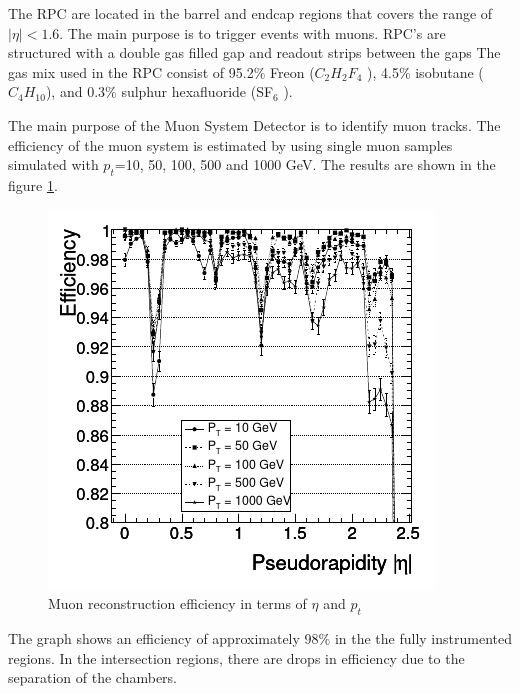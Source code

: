 The RPC are located in the barrel and endcap regions that covers the range of $|\eta|<1.6$. The main purpose is to trigger events with muons. 
RPC's are structured with a double gas filled gap and readout strips between the gaps
 The gas mix used in the RPC consist of 95.2$\%$ Freon
($C_2 H_2 F_4$ ), 4.5$\%$ isobutane ($C_4 H_{10}$), and 0.3$\%$ sulphur hexafluoride (SF$_6$ )\cite{cms7}.



The main purpose of the Muon System Detector is to identify muon tracks. 
The efficiency of the muon system is estimated by using single muon samples simulated with $p_t$=10, 50, 100, 500 and 1000 GeV. The results are shown in the figure \ref{mu-efi}.
\begin{figure}
	\centering
	\includegraphics[width=0.6\linewidth]{Chapter2/mu-efi}
	\caption[Muon reconstruction efficiency in terms of $\eta$ and $p_t$]{Muon reconstruction efficiency in terms of $\eta$ and $p_t$\cite{cms-manual}}
	\label{mu-efi}
\end{figure}
The graph shows an efficiency of approximately 98$\%$ in the the fully instrumented regions. In the intersection regions, there are drops in efficiency due to the separation of the chambers. %
